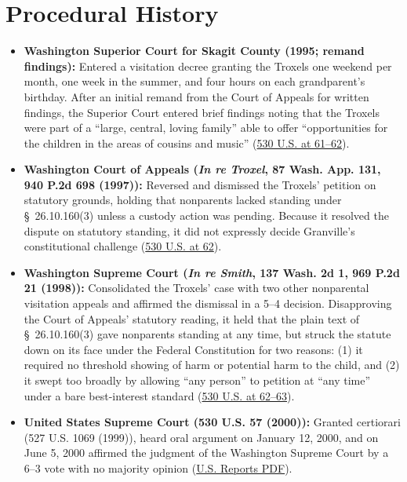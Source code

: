 \documentclass[12pt]{article}
\begin{document}
\section{Procedural History}
\begin{itemize}
\item \textbf{Washington Superior Court for Skagit County (1995; remand findings):} Entered a visitation decree granting the Troxels one weekend per month, one week in the summer, and four hours on each grandparent's birthday. After an initial remand from the Court of Appeals for written findings, the Superior Court entered brief findings noting that the Troxels were part of a ``large, central, loving family'' able to offer ``opportunities for the children in the areas of cousins and music'' (\href{https://www.law.cornell.edu/supremecourt/text/99-138}{530 U.S. at 61--62}).
\item \textbf{Washington Court of Appeals (\textit{In re Troxel}, 87 Wash. App. 131, 940 P.2d 698 (1997)):} Reversed and dismissed the Troxels' petition on statutory grounds, holding that nonparents lacked standing under \S\ 26.10.160(3) unless a custody action was pending. Because it resolved the dispute on statutory standing, it did not expressly decide Granville's constitutional challenge (\href{https://www.law.cornell.edu/supremecourt/text/99-138}{530 U.S. at 62}).
\item \textbf{Washington Supreme Court (\textit{In re Smith}, 137 Wash. 2d 1, 969 P.2d 21 (1998)):} Consolidated the Troxels' case with two other nonparental visitation appeals and affirmed the dismissal in a 5--4 decision. Disapproving the Court of Appeals' statutory reading, it held that the plain text of \S\ 26.10.160(3) gave nonparents standing at any time, but struck the statute down on its face under the Federal Constitution for two reasons: (1) it required no threshold showing of harm or potential harm to the child, and (2) it swept too broadly by allowing ``any person'' to petition at ``any time'' under a bare best-interest standard (\href{https://www.law.cornell.edu/supremecourt/text/99-138}{530 U.S. at 62--63}).
\item \textbf{United States Supreme Court (530 U.S. 57 (2000)):} Granted certiorari (527 U.S. 1069 (1999)), heard oral argument on January 12, 2000, and on June 5, 2000 affirmed the judgment of the Washington Supreme Court by a 6--3 vote with no majority opinion (\href{https://tile.loc.gov/storage-services/service/ll/usrep/usrep530/usrep530057/usrep530057.pdf}{U.S. Reports PDF}).
\end{itemize}
\end{document}
